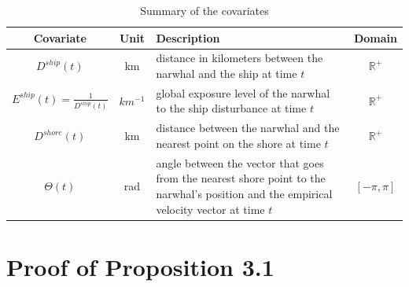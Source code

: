 \documentclass[aoas]{imsart}
\theoremstyle{definition}
\theoremstyle{remark}
\theoremstyle{remark}
\newcommand {\R}{\mathbb{R}}
\newcommand {\1}{\mathbb{1}}
\begin{document}
\begin{table}[ht!]
	\centering
	\begin{tabular}{|c|c|p{8cm}|c|}
		\hline
		Covariate & Unit & Description & Domain \\
		\hline
		$D^{ship}(t)$ & km & distance in kilometers between the narwhal and the ship at time $t$ & $\R^+$ \\
		\hline
		$E^{ship}(t)=\frac{1}{D^{ship}(t)}$ & $km^{-1}$ & global exposure level of the narwhal to the ship disturbance at time $t$ & $\R^+$ \\
		\hline
		$D^{shore}(t)$ & km & distance between the narwhal and the nearest point on the shore at time $t$ & $\R^+$ \\
		\hline
		$\Theta(t)$ & rad & angle between the vector that goes from the nearest shore point to the narwhal's position and the empirical velocity vector at time $t$  & $[-\pi,\pi]$ \\
		\hline 
	\end{tabular}
	\caption{Summary of the covariates}
	\label{tab: summary covariates}
\end{table}


\section{Proof of Proposition 3.1}
\label{section: transition density proof}
\end{document}
